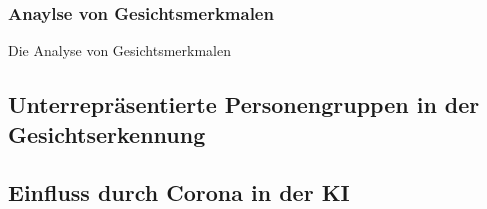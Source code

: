 \subsubsection{Anaylse von Gesichtsmerkmalen}
Die Analyse von Gesichtsmerkmalen 





\subsection{Unterrepräsentierte Personengruppen in der Gesichtserkennung}



\subsection{Einfluss durch Corona in der KI}
